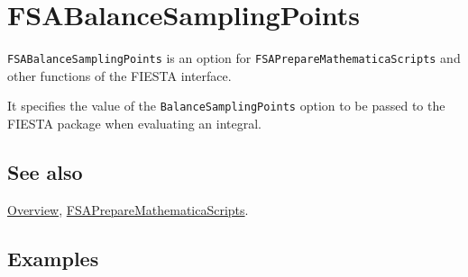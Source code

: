 \documentclass[../FeynHelpersManual.tex]{subfiles}
\begin{document}
\hypertarget{fsabalancesamplingpoints}{
\section{FSABalanceSamplingPoints}\label{fsabalancesamplingpoints}}

\texttt{FSABalanceSamplingPoints} is an option for
\texttt{FSAPrepareMathematicaScripts} and other functions of the FIESTA
interface.

It specifies the value of the \texttt{BalanceSamplingPoints} option to
be passed to the FIESTA package when evaluating an integral.

\subsection{See also}

\hyperlink{toc}{Overview},
\hyperlink{fsapreparemathematicascripts}{FSAPrepareMathematicaScripts}.

\subsection{Examples}
\end{document}
